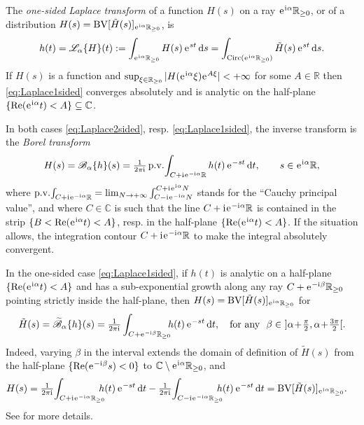 \documentclass[a4paper,11pt]{amsart}
\numberwithin{equation}{section}
\newcommand{\C}{{\mathbb C}}
\newcommand{\R}{{\mathbb R}}
\newcommand{\sminus}{\setminus} %
\newcommand{\re}{\operatorname{Re}}
\renewcommand{\i}{\mathrm{i}\mkern.25\thinmuskip}
\renewcommand{\d}{\ensuremath{\operatorname{d}\!}}
\newcommand{\e}{\ensuremath{\mkern.25\thinmuskip\mathrm{e}\mkern.4\thinmuskip}}
\newcommand{\Borel}{\mathscr{B}}
\newcommand{\Laplace}{\mathscr{L}}
\newcommand{\BV}{\operatorname{BV}}
\newcommand{\Circ}{\operatorname{Circ}}
\newcommand{\VP}{\operatorname{p.\!v.\!}}
\theoremstyle{definition}
\begin{document}
The \emph{one-sided Laplace transform} of a function $H(s)$ on a ray $\e^{\i\alpha}\R_{\geq 0}$,  or of a distribution $H(s)=\BV[\tilde H(s)]_{\e^{\i\alpha}\R_{\geq 0}}$, is 
\begin{equation}\label{eq:Laplace1sided}
	h(t)=\Laplace_\alpha\{H\}(t):=\int_{\e^{\i\alpha}\R_{\geq 0}} H(s)\,\e^{st}\d s=\int_{\Circ(\e^{\i\alpha}\R_{\geq 0})}\tilde H(s)\,\e^{st}\d s.
\end{equation} 
If $H(s)$ is a function and $\sup_{\xi\in\R_{\geq 0}}|H(\e^{\i\alpha}\xi)\e^{A\xi}|<+\infty$ for some $A\in\R$ then \eqref{eq:Laplace1sided} converges absolutely and is analytic on the half-plane $\{\re(\e^{\i\alpha}t)<A\}\subseteq\C$.



In both cases \eqref{eq:Laplace2sided}, resp. \eqref{eq:Laplace1sided}, the inverse transform is the \emph{Borel transform}
\begin{equation}\label{eq:Borel2sided}
	H(s)=\Borel_\alpha\{h\}(s)=\tfrac{1}{2\pi\i }\VP\int_{C+\i \e^{-\i \alpha}\R} h(t)\,\e^{-st}\d t,\qquad s\in \e^{\i\alpha}\R,
\end{equation} 
where $\VP\int_{C+\i \e^{-\i \alpha}\R}=\lim_{N\to+\infty}\int_{C-\i \e^{-\i \alpha}N}^{C+\i \e^{\i\alpha}N}$ stands for the ``Cauchy principal value'', and where $C\in\C$ is such that the line $C+\i \e^{-\i \alpha}\R$ is contained in the strip $\{B<\re(\e^{\i\alpha}t)<A\}$, resp. in the half-plane $\{\re(\e^{\i\alpha}t)<A\}$.
If the situation allows, the integration contour $ C+\i \e^{-\i \alpha}\R$  to make the integral absolutely convergent.

In the one-sided case \eqref{eq:Laplace1sided}, if $h(t)$ is analytic on a half-plane  $\{\re(\e^{\i\alpha}t)<A\}$ and has a sub-exponential growth along any ray 
$C+\e^{-\i \beta}\R_{\geq 0}$ pointing strictly inside the half-plane,
then $H(s)=\BV[\tilde H(s)]_{\e^{\i\alpha}\R_{\geq 0}}$ for
\begin{equation*}\label{eq:Borel1sided}
\tilde H(s)=\widetilde{\Borel}_\alpha\{h\}(s)=\tfrac{1}{2\pi\i}\int_{C+\e^{-\i \beta}\R_{\geq 0}}\!\!\! h(t)\,\e^{-st}\d t,\quad
\text{for any }\ \beta\in\
 ]\alpha\!+\!\tfrac{\pi}{2},\alpha\!+\!\tfrac{3\pi}{2}[.
\end{equation*}
Indeed, varying $\beta$ in the interval extends the domain of definition of $\tilde H(s)$ from the half-plane $\{\re(\e^{-\i\beta}s)<0\}$ to $\C\sminus \e^{\i\alpha}\R_{\geq 0}$, and
\begin{align*}
	H(s)&=\tfrac{1}{2\pi\i }\!\int_{C+\i \e^{-\i \alpha}\R_{\geq 0}}\!\!\!\!\! h(t)\,\e^{-st}\d t - \tfrac{1}{2\pi\i }\!\int_{C-\i \e^{-\i \alpha}\R_{\geq 0}}\!\!\!\!\! h(t)\,\e^{-st}\d t =\BV[\tilde H(s)]_{\e^{\i\alpha}\R_{\geq 0}}.
\end{align*}
See \cite{Komatsu} for more details.
\end{document}
